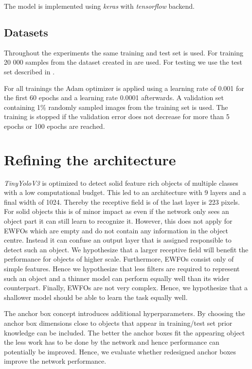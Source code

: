 	The model is implemented using \textit{keras} with \textit{tensorflow} backend. 
	
	\subsection{Datasets}
	
	Throughout the experiments the same training and test set is used. For training 20 000 samples from the dataset created in  are used. For testing we use the test set described in .

	For all trainings the Adam optimizer is applied using a learning rate of 0.001 for the first 60 epochs and a learning rate 0.0001 afterwards. A validation set containing 1\% randomly sampled images from the training set is used. The training is stopped if the validation error does not decrease for more than 5 epochs or 100 epochs are reached.
	
	\section{Refining the architecture}
	
	\textit{TinyYoloV3} is optimized to detect solid feature rich objects of multiple classes with a low computational budget. This led to an architecture with 9 layers and a final width of 1024. Thereby the receptive field is of the last layer is 223 pixels. For solid objects this is of minor impact as even if the network only sees an object part it can still learn to recognize it. However, this does not apply for \acp{EWFO} which are empty and do not contain any information in the object centre. Instead it can confuse an output layer that is assigned responsible to detect such an object. We hypothesize that a larger receptive field will benefit the performance for objects of higher scale. Furthermore, \acp{EWFO} consist only of simple features. Hence we hypothesize that less filters are required to represent such an object and a thinner model can perform equally well than its wider counterpart. Finally, \acp{EWFO} are not very complex. Hence, we hypothesize that a shallower model should be able to learn the task equally well.
	
	The anchor box concept introduces additional hyperparameters. By choosing the anchor box dimensions close to objects that appear in training/test set prior knowledge can be included. The better the anchor boxes fit the appearing object the less work has to be done by the network and hence performance can potentially be improved. Hence, we evaluate whether redesigned anchor boxes improve the network performance. 
	
